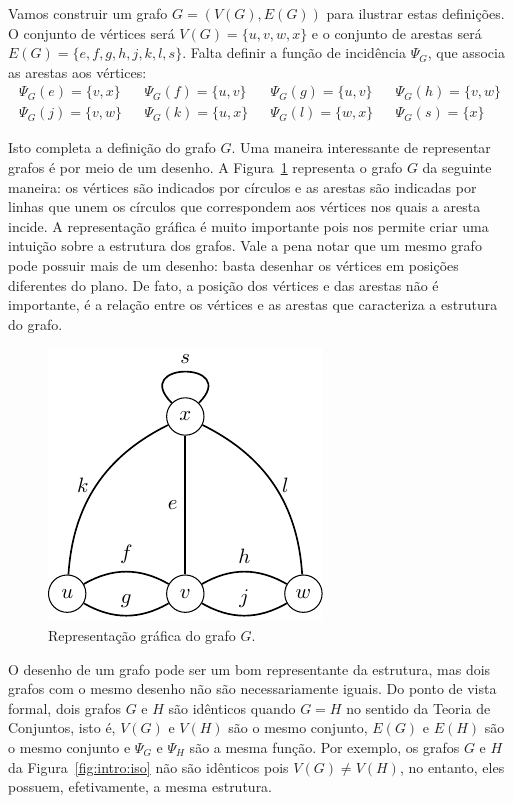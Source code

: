 Vamos construir um grafo $G = (V(G), E(G))$ para ilustrar estas definições. O conjunto de vértices será $V(G) = \{u,v,w,x\}$ e o conjunto de arestas será $E(G) = \{e, f, g, h, j, k, l, s\}$. Falta definir a função de incidência $\Psi_G$, que associa as arestas aos vértices:
\begin{align*}
\Psi_G(e) = \{v,x\} & &
\Psi_G(f) = \{u,v\} & &
\Psi_G(g) = \{u,v\} & &
\Psi_G(h) = \{v,w\} \\
\Psi_G(j) = \{v,w\} & &
\Psi_G(k) = \{u,x\} & &
\Psi_G(l) = \{w,x\} & &
\Psi_G(s) = \{x\}
\end{align*}

Isto completa a definição do grafo $G$. Uma maneira interessante de representar grafos é por meio de um desenho. A Figura~\ref{fig:intro:grafo} representa o grafo $G$ da seguinte maneira: os vértices são indicados por círculos e as arestas são indicadas por linhas que unem os círculos que correspondem aos vértices nos quais a aresta incide. A representação gráfica é muito importante pois nos permite criar uma intuição sobre a estrutura dos grafos. Vale a pena notar que um mesmo grafo pode possuir mais de um desenho: basta desenhar os vértices em posições diferentes do plano. De fato, a posição dos vértices e das arestas não é importante, é a relação entre os vértices e as arestas que caracteriza a estrutura do grafo.

\begin{figure}[ht!]
\centering
\includegraphics{figures/1_intro_1_grafo}
\caption{Representação gráfica do grafo $G$.}
\label{fig:intro:grafo}
\end{figure}

O desenho de um grafo pode ser um bom representante da estrutura, mas dois grafos com o mesmo desenho não são necessariamente iguais. Do ponto de vista formal, dois grafos $G$ e $H$ são idênticos quando $G = H$ no sentido da Teoria de Conjuntos, isto é, $V(G)$ e $V(H)$ são o mesmo conjunto, $E(G)$ e $E(H)$ são o mesmo conjunto e $\Psi_G$ e $\Psi_H$ são a mesma função. Por exemplo, os grafos $G$ e $H$ da Figura~\ref{fig:intro:iso} não são idênticos pois $V(G) \neq V(H)$, no entanto, eles possuem, efetivamente, a mesma estrutura.


